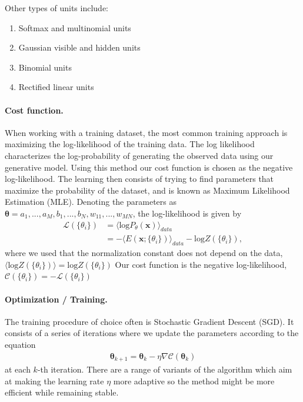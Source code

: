 \documentclass[%
oneside,                 %
final,                   %
10pt]{article}
\begin{document}
\noindent
Other types of units include:
\begin{enumerate}
\item Softmax and multinomial units

\item Gaussian visible and hidden units

\item Binomial units

\item Rectified linear units
\end{enumerate}

\noindent
\paragraph{Cost function.}
When working with a training dataset, the most common training approach is maximizing the log-likelihood of the training data. The log likelihood characterizes the log-probability of generating the observed data using our generative model. Using this method our cost function is chosen as the negative log-likelihood. The learning then consists of trying to find parameters that maximize the probability of the dataset, and is known as Maximum Likelihood Estimation (MLE).
Denoting the parameters as $\bm{\theta} = a_1,...,a_M,b_1,...,b_N,w_{11},...,w_{MN}$, the log-likelihood is given by
\begin{align}
	\mathcal{L}(\{ \theta_i \}) &= \langle \text{log} P_\theta(\bm{x}) \rangle_{data} \\
	&= - \langle E(\bm{x}; \{ \theta_i\}) \rangle_{data} - \text{log} Z(\{ \theta_i\}),
\end{align}
where we used that the normalization constant does not depend on the data, $\langle \text{log} Z(\{ \theta_i\}) \rangle = \text{log} Z(\{ \theta_i\})$
Our cost function is the negative log-likelihood, $\mathcal{C}(\{ \theta_i \}) = - \mathcal{L}(\{ \theta_i \})$

\paragraph{Optimization / Training.}
The training procedure of choice often is Stochastic Gradient Descent (SGD). It consists of a series of iterations where we update the parameters according to the equation
\begin{align}
	\bm{\theta}_{k+1} = \bm{\theta}_k - \eta \nabla \mathcal{C} (\bm{\theta}_k)
\end{align}
at each $k$-th iteration. There are a range of variants of the algorithm which aim at making the learning rate $\eta$ more adaptive so the method might be more efficient while remaining stable.
\end{document}
